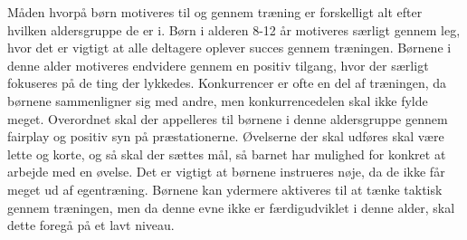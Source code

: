 Måden hvorpå børn motiveres til og gennem træning er forskelligt alt efter hvilken aldersgruppe de er i. Børn i alderen 8-12 år motiveres særligt gennem leg, hvor det er vigtigt at alle deltagere oplever succes gennem træningen. Børnene i denne alder motiveres endvidere gennem en positiv tilgang, hvor der særligt fokuseres på de ting der lykkedes. Konkurrencer er ofte en del af træningen, da børnene sammenligner sig med andre, men konkurrencedelen skal ikke fylde meget. Overordnet skal der appelleres til børnene i denne aldersgruppe gennem fairplay og positiv syn på præstationerne. Øvelserne der skal udføres skal være lette og korte, og så skal der sættes mål, så barnet har mulighed for konkret at arbejde med en øvelse. Det er vigtigt at børnene instrueres nøje, da de ikke får meget ud af egentræning. Børnene kan ydermere aktiveres til at tænke taktisk gennem træningen, men da denne evne ikke er færdigudviklet i denne alder, skal dette foregå på et lavt niveau. \citep{Wied2011} 


